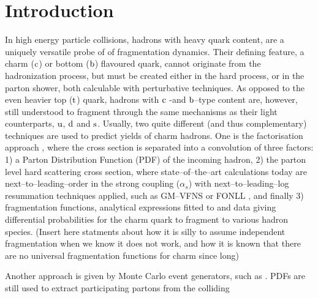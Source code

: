 \documentclass[main.tex]{subfiles}
\begin{document}
\section{Introduction}
In high energy particle collisions, hadrons with heavy quark content, are a uniquely versatile probe of of fragmentation dynamics. Their defining feature, a charm ($\mathrm{c}$) or bottom ($\mathrm{b}$) 
flavoured quark, cannot originate from the hadronization process, but must be created either in the hard process, or in the parton shower, both calculable with perturbative techniques. 
As opposed to the even heavier top ($\mathrm{t}$) quark, hadrons with $\mathrm{c}$ -and $\mathrm{b}$--type content are, however, still understood to fragment through the same mechanisms as their 
light counterparts, $\mathrm{u}$, $\mathrm{d}$ and $\mathrm{s}$. Usually, two quite different (and thus complementary) 
techniques are used to predict yields of charm hadrons. One is the factorisation approach \cite{}, where the cross section is separated into a convolution of three factors: 1) a Parton Distribution 
Function (PDF) of the incoming hadron, 2) the parton level hard scattering cross section, where state--of--the--art calculations today are next--to--leading--order in the strong coupling 
($\alpha_s$) with next--to--leading--log resummation techniques applied, such as \eg GM--VFNS \cite{} or FONLL \cite{}, and finally 3) fragmentation functions, analytical expressions fitted to 
\epem and \ep data \cite{} giving differential probabilities for the charm quark to fragment to various hadron species. (Insert here statments about how it is silly to assume independent fragmentation
when we know it does not work, and how it is known that there are no universal fragmentation functions for charm since long)

Another approach is given by Monte Carlo event generators, such as \pythia \cite{}. PDFs are still used to extract participating partons from the colliding 
\end{document}
